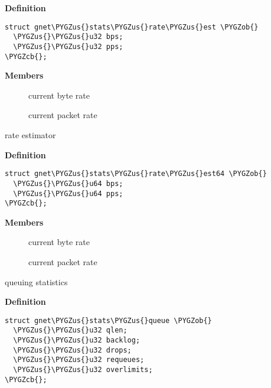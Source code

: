 \documentclass[a4paper,8pt,english]{sphinxmanual}
\def\PYGZus{\char`\_}
\def\PYGZob{\char`\{}
\def\PYGZcb{\char`\}}
\begin{document}
\textbf{Definition}

\begin{Verbatim}[commandchars=\\\{\}]
struct gnet\PYGZus{}stats\PYGZus{}rate\PYGZus{}est \PYGZob{}
  \PYGZus{}\PYGZus{}u32 bps;
  \PYGZus{}\PYGZus{}u32 pps;
\PYGZcb{};
\end{Verbatim}

\textbf{Members}
\begin{description}
\item[{}] \leavevmode
current byte rate

\item[{}] \leavevmode
current packet rate

\end{description}

\begin{fulllineitems}
\label{networking/kapi:c.gnet_stats_rate_est64}
rate estimator

\end{fulllineitems}


\textbf{Definition}

\begin{Verbatim}[commandchars=\\\{\}]
struct gnet\PYGZus{}stats\PYGZus{}rate\PYGZus{}est64 \PYGZob{}
  \PYGZus{}\PYGZus{}u64 bps;
  \PYGZus{}\PYGZus{}u64 pps;
\PYGZcb{};
\end{Verbatim}

\textbf{Members}
\begin{description}
\item[{}] \leavevmode
current byte rate

\item[{}] \leavevmode
current packet rate

\end{description}

\begin{fulllineitems}
\label{networking/kapi:c.gnet_stats_queue}
queuing statistics

\end{fulllineitems}


\textbf{Definition}

\begin{Verbatim}[commandchars=\\\{\}]
struct gnet\PYGZus{}stats\PYGZus{}queue \PYGZob{}
  \PYGZus{}\PYGZus{}u32 qlen;
  \PYGZus{}\PYGZus{}u32 backlog;
  \PYGZus{}\PYGZus{}u32 drops;
  \PYGZus{}\PYGZus{}u32 requeues;
  \PYGZus{}\PYGZus{}u32 overlimits;
\PYGZcb{};
\end{Verbatim}
\end{document}
